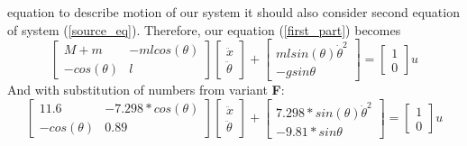 \documentclass[a4paper,12pt]{article}
\begin{document}
    equation to describe motion of our system it should also consider second
    equation of system (\ref{source_eq}). Therefore, our equation (\ref{first_part})
    becomes
    \begin{equation}
        \begin{bmatrix}
            M+m & -mlcos(\theta) \\
            -cos(\theta) & l
        \end{bmatrix}
        \begin{bmatrix}
            \ddot x \\ 
            \ddot\theta
        \end{bmatrix}
        +
        \begin{bmatrix}
            mlsin(\theta)\dot\theta^2\\
            -gsin\theta
        \end{bmatrix}
        = 
        \begin{bmatrix}
            1\\
            0
        \end{bmatrix}u
    \end{equation}
    And with substitution of numbers from variant \textbf{F}:
    \begin{equation}
        \begin{bmatrix}
            11.6 & -7.298 * cos(\theta) \\
            -cos(\theta) & 0.89
        \end{bmatrix}
        \begin{bmatrix}
            \ddot x \\ 
            \ddot\theta
        \end{bmatrix}
        +
        \begin{bmatrix}
            7.298*sin(\theta)\dot\theta^2\\
            -9.81*sin\theta
        \end{bmatrix}
        = 
        \begin{bmatrix}
            1\\
            0
        \end{bmatrix}u
    \end{equation}
\end{document}
